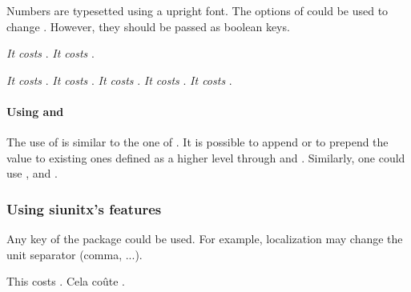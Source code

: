 \documentclass[12pt,add-index]{cnltx-doc}
\begin{document}
Numbers are typesetted using a upright font. The 
options of  could be used to change \cite[\S~5.2]{siunitx}.
However, they should be passed as boolean keys. 


\begin{example}
    \textit{It costs }.
    \textit{It costs }.
    \begin{empty}
    \textit{It costs }.
    \textit{It costs }.
    \textit{It costs }.
    \textit{It costs }.
    \textit{It costs }.
    \end{empty}
\end{example}

\paragraph*{Using  and }

The use of  is similar to the one of .
It is possible to append or to prepend the value to existing ones
defined as a higher level through  and .
Similarly, one could use ,  and .

\begin{example}
\end{example}

\subsubsection{Using siunitx's features}

Any key of the  package could be used. 
For example, localization may change the unit separator (comma, ...).

\begin{example}
    This costs .
    { Cela co\^ute .}
\end{example}
\end{document}

